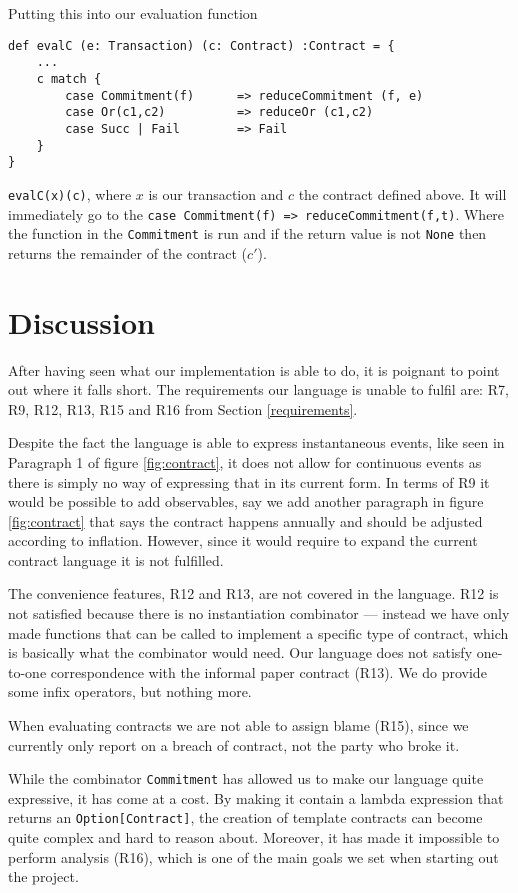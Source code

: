 \documentclass{ituthesis}
\begin{document}
Putting this into our evaluation function 
\begin{lstlisting}
def evalC (e: Transaction) (c: Contract) :Contract = { 
    ...
    c match {
        case Commitment(f)      => reduceCommitment (f, e)
        case Or(c1,c2)          => reduceOr (c1,c2)
        case Succ | Fail        => Fail
    }
}
\end{lstlisting}
\texttt{evalC(x)(c)}, where $x$ is our transaction and $c$ the contract defined above. It will immediately go to the \texttt{case Commitment(f) => reduceCommitment(f,t)}. Where the function in the \texttt{Commitment} is run and if the return value is not \texttt{None} then returns the remainder of the contract ($c'$).

\chapter{Discussion}
After having seen what our implementation is able to do, it is poignant to point out where it falls short. The requirements our language is unable to fulfil are: R7, R9, R12, R13, R15 and R16 from Section \ref{requirements}.

Despite the fact the language is able to express instantaneous events, like seen in Paragraph 1 of figure \ref{fig:contract}, it does not allow for continuous events as there is simply no way of expressing that in its current form. In terms of R9 it would be possible to add observables, say we add another paragraph in figure \ref{fig:contract} that says the contract happens annually and should be adjusted according to inflation. However, since it would require to expand the current contract language it is not fulfilled.

The convenience features, R12 and R13, are not covered in the language. R12 is not satisfied because there is no instantiation combinator --- instead we have only made functions that can be called to implement a specific type of contract, which is basically what the combinator would need. Our language does not satisfy one-to-one correspondence with the informal paper contract (R13). We do provide some infix operators, but nothing more.

When evaluating contracts we are not able to assign blame (R15), since we currently only report on a breach of contract, not the party who broke it.

While the combinator \texttt{Commitment} has allowed us to make our language quite expressive, it has come at a cost. By making it contain a lambda expression that returns an \texttt{Option[Contract]}, the creation of template contracts can become quite complex and hard to reason about. Moreover, it has made it impossible to perform analysis (R16), which is one of the main goals we set when starting out the project.
\end{document}
